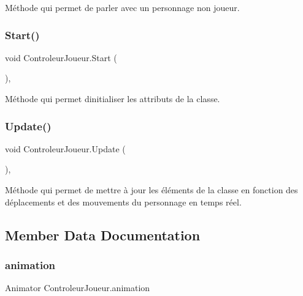 Méthode qui permet de parler avec un personnage non joueur. \mbox{\label{class_controleur_joueur_adf151124295f736d0d940a3b3601f35e}} 
\subsubsection{\texorpdfstring{Start()}{Start()}}
{\footnotesize\ttfamily void Controleur\+Joueur.\+Start (\begin{DoxyParamCaption}{ }\end{DoxyParamCaption})\hspace{0.3cm}{\ttfamily [inline]}, {\ttfamily [private]}}

Méthode qui permet d\textquotesingle{}initialiser les attributs de la classe. \mbox{\label{class_controleur_joueur_a071e21e095c237bccef56bd6bea690fc}} 
\subsubsection{\texorpdfstring{Update()}{Update()}}
{\footnotesize\ttfamily void Controleur\+Joueur.\+Update (\begin{DoxyParamCaption}{ }\end{DoxyParamCaption})\hspace{0.3cm}{\ttfamily [inline]}, {\ttfamily [private]}}

Méthode qui permet de mettre à jour les éléments de la classe en fonction des déplacements et des mouvements du personnage en temps réel. 

\subsection{Member Data Documentation}
\mbox{\label{class_controleur_joueur_aac567782c2c28039b94ca89700437d97}} 
\subsubsection{\texorpdfstring{animation}{animation}}
{\footnotesize\ttfamily Animator Controleur\+Joueur.\+animation\hspace{0.3cm}{\ttfamily [private]}}

